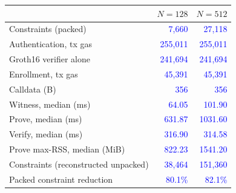 \begin{tabular}{lrr}
\toprule
 & $N{=}128$ & $N{=}512$ \\
\midrule
Constraints (packed) & \textcolor{blue}{7{,}660} & \textcolor{blue}{27{,}118} \\
Authentication, tx gas & \textcolor{blue}{255{,}011} & \textcolor{blue}{255{,}011} \\
\quad Groth16 verifier alone & \textcolor{blue}{241{,}694} & \textcolor{blue}{241{,}694} \\
Enrollment, tx gas & \textcolor{blue}{45{,}391} & \textcolor{blue}{45{,}391} \\
Calldata (B) & \textcolor{blue}{356} & \textcolor{blue}{356} \\
Witness, median (ms) & \textcolor{blue}{64.05} & \textcolor{blue}{101.90} \\
Prove, median (ms) & \textcolor{blue}{631.87} & \textcolor{blue}{1031.60} \\
Verify, median (ms) & \textcolor{blue}{316.90} & \textcolor{blue}{314.58} \\
Prove max-RSS, median (MiB) & \textcolor{blue}{822.23} & \textcolor{blue}{1541.20} \\
Constraints (reconstructed unpacked) & \textcolor{blue}{38{,}464} & \textcolor{blue}{151{,}360} \\
Packed constraint reduction & \textcolor{blue}{80.1\%} & \textcolor{blue}{82.1\%} \\
\bottomrule
\end{tabular}
